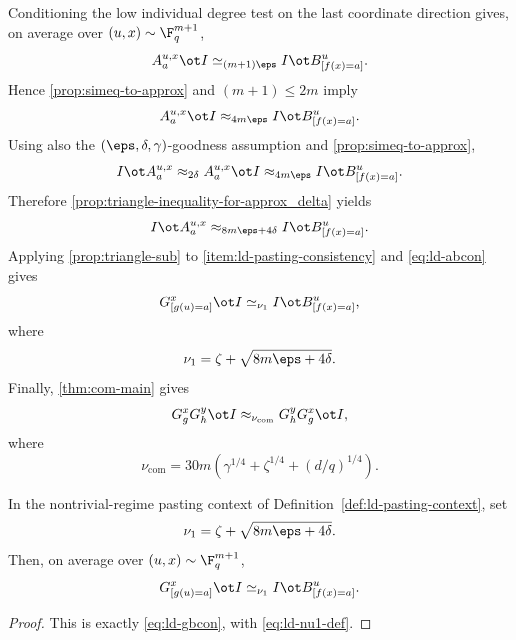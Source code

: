 Conditioning the low individual degree test on the last coordinate direction gives, on average over $(u,x) \sim \F_q^{m+1}$,
\[
	A_a^{u,x} \ot I \simeq_{(m+1)\eps} I \ot B^u_{[f(x)=a]}.
\]
Hence \ref{prop:simeq-to-approx} and $(m+1)\le 2m$ imply
\[
	A_a^{u,x} \ot I \approx_{4m\eps} I \ot B^u_{[f(x)=a]}.
\]
Using also the $(\eps,\delta,\gamma)$-goodness assumption and \ref{prop:simeq-to-approx},
\[
	I \ot A_a^{u,x} \approx_{2\delta} A_a^{u,x} \ot I \approx_{4m\eps} I \ot B^u_{[f(x)=a]}.
\]
Therefore \ref{prop:triangle-inequality-for-approx_delta} yields
\begin{equation}\label{eq:ld-abcon}
	I \ot A_a^{u,x} \approx_{8m\eps+4\delta} I \ot B^u_{[f(x)=a]}.
\end{equation}
Applying \ref{prop:triangle-sub} to \ref{item:ld-pasting-consistency} and \ref{eq:ld-abcon} gives
\begin{equation}\label{eq:ld-gbcon}
	G^x_{[g(u)=a]} \ot I \simeq_{\nu_1} I \ot B^u_{[f(x)=a]},
\end{equation}
where
\begin{equation}\label{eq:ld-nu1-def}
	\nu_1 = \zeta + \sqrt{8m\eps+4\delta}.
\end{equation}
Finally, \ref{thm:com-main} gives
\begin{equation}\label{eq:complete-slice-commutativity}
	G_g^x G_h^y \ot I \approx_{\nu_{\mathrm{com}}} G_h^y G_g^x \ot I,
\end{equation}
where
\[
	\nu_{\mathrm{com}} = 30m\left(\gamma^{1/4}+\zeta^{1/4}+(d/q)^{1/4}\right).
\]

\begin{lemma}\label{lem:ld-gbcon}
	\leanok
	In the nontrivial-regime pasting context of Definition~\ref{def:ld-pasting-context}, set
	\[
		\nu_1 = \zeta + \sqrt{8m\eps+4\delta}.
	\]
	Then, on average over $(u,x) \sim \F_q^{m+1}$,
	\[
		G^x_{[g(u)=a]} \ot I \simeq_{\nu_1} I \ot B^u_{[f(x)=a]}.
	\]
\end{lemma}
\begin{proof}
	\leanok
	This is exactly \ref{eq:ld-gbcon}, with \ref{eq:ld-nu1-def}.
\end{proof}

